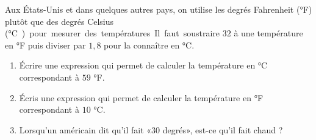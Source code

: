 
\begin{exercice}\label{exosmath-0734}

Aux États-Unis et dans quelques autres pays, on utilise les degrés Fahrenheit (°F) plutôt que des degrés Celsius (\si\degreeCelsius) pour mesurer des températures. Il faut soustraire $32$ à une température en °F puis diviser par $1,8$ pour la connaître en °C.  

\begin{enumerate}
    \item
Écrire une expression qui permet de calculer la température en °C correspondant à $59$ °F.
\item
Écris une expression qui permet de calculer la température en °F correspondant à $10$ °C.
\item
    Lorsqu'un américain dit qu'il fait «\( 30\) degrés», est-ce qu'il fait chaud ?
\end{enumerate}
\end{exercice}
